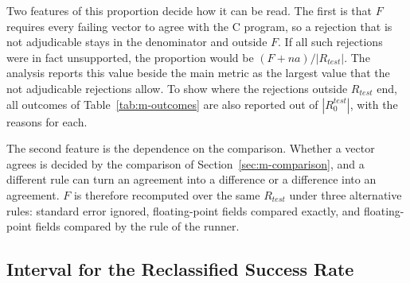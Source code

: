 Two features of this proportion decide how it can be read. The first is that $F$ requires every failing vector to agree with the C program, so a rejection that is not adjudicable stays in the denominator and outside $F$. If all such rejections were in fact unsupported, the proportion would be $(F + \mathit{na})/|R_{\mathit{test}}|$. The analysis reports this value beside the main metric as the largest value that the not adjudicable rejections allow. To show where the rejections outside $R_{\mathit{test}}$ end, all outcomes of Table~\ref{tab:m-outcomes} are also reported out of $|R_0^{\mathit{test}}|$, with the reasons for each.

The second feature is the dependence on the comparison. Whether a vector agrees is decided by the comparison of Section~\ref{sec:m-comparison}, and a different rule can turn an agreement into a difference or a difference into an agreement. $F$ is therefore recomputed over the same $R_{\mathit{test}}$ under three alternative rules: standard error ignored, floating-point fields compared exactly, and floating-point fields compared by the rule of the runner.

\subsection{Interval for the Reclassified Success Rate}\label{sec:m-rq3}

